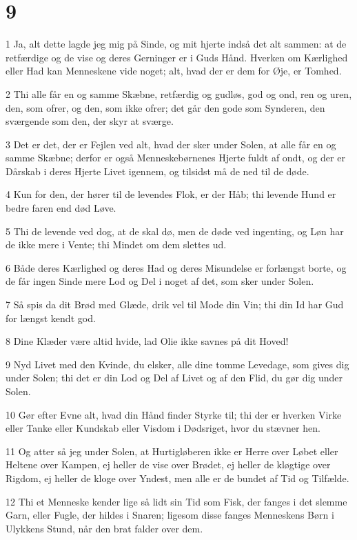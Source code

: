 \chapter{9}

\par 1 Ja, alt dette lagde jeg mig på Sinde, og mit hjerte indså det alt sammen: at de retfærdige og de vise og deres Gerninger er i Guds Hånd. Hverken om Kærlighed eller Had kan Menneskene vide noget; alt, hvad der er dem for Øje, er Tomhed.
\par 2 Thi alle får en og samme Skæbne, retfærdig og gudløs, god og ond, ren og uren, den, som ofrer, og den, som ikke ofrer; det går den gode som Synderen, den sværgende som den, der skyr at sværge.
\par 3 Det er det, der er Fejlen ved alt, hvad der sker under Solen, at alle får en og samme Skæbne; derfor er også Menneskebørnenes Hjerte fuldt af ondt, og der er Dårskab i deres Hjerte Livet igennem, og tilsidst må de ned til de døde.
\par 4 Kun for den, der hører til de levendes Flok, er der Håb; thi levende Hund er bedre faren end død Løve.
\par 5 Thi de levende ved dog, at de skal dø, men de døde ved ingenting, og Løn har de ikke mere i Vente; thi Mindet om dem slettes ud.
\par 6 Både deres Kærlighed og deres Had og deres Misundelse er forlængst borte, og de får ingen Sinde mere Lod og Del i noget af det, som sker under Solen.
\par 7 Så spis da dit Brød med Glæde, drik vel til Mode din Vin; thi din Id har Gud for længst kendt god.
\par 8 Dine Klæder være altid hvide, lad Olie ikke savnes på dit Hoved!
\par 9 Nyd Livet med den Kvinde, du elsker, alle dine tomme Levedage, som gives dig under Solen; thi det er din Lod og Del af Livet og af den Flid, du gør dig under Solen.
\par 10 Gør efter Evne alt, hvad din Hånd finder Styrke til; thi der er hverken Virke eller Tanke eller Kundskab eller Visdom i Dødsriget, hvor du stævner hen.
\par 11 Og atter så jeg under Solen, at Hurtigløberen ikke er Herre over Løbet eller Heltene over Kampen, ej heller de vise over Brødet, ej heller de kløgtige over Rigdom, ej heller de kloge over Yndest, men alle er de bundet af Tid og Tilfælde.
\par 12 Thi et Menneske kender lige så lidt sin Tid som Fisk, der fanges i det slemme Garn, eller Fugle, der hildes i Snaren; ligesom disse fanges Menneskens Børn i Ulykkens Stund, når den brat falder over dem.
